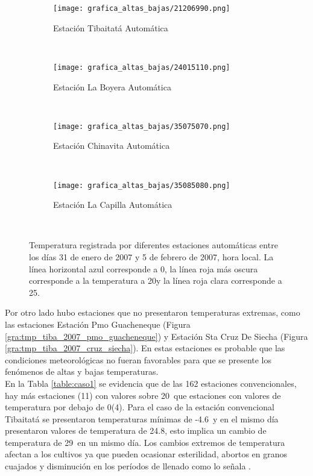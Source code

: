 \begin{figure}[H]\ContinuedFloat
\centering
\begin{subfigure}[normla]{0.4\textwidth}
\caption{Estación Tibaitatá Automática}
\texttt{[image: grafica\_altas\_bajas/21206990.png]}
\label{gra:tmp_tiba_2007_tibaitata}
\end{subfigure}
~
\begin{subfigure}[normla]{0.4\textwidth}
\caption{Estación La Boyera Automática}
\texttt{[image: grafica\_altas\_bajas/24015110.png]}
\label{gra:tmp_tiba_2007_la_boyera}
\end{subfigure}
~
\begin{subfigure}[normla]{0.4\textwidth}
\caption{Estación Chinavita Automática}
\texttt{[image: grafica\_altas\_bajas/35075070.png]}
\label{gra:tmp_tiba_2007_chinavita}
\end{subfigure}
~
\begin{subfigure}[normla]{0.4\textwidth}
\caption{Estación La Capilla Automática}
\texttt{[image: grafica\_altas\_bajas/35085080.png]}
\label{gra:tmp_tiba_2007_capilla}
\end{subfigure}
~
    
    
    \caption{Temperatura registrada por diferentes estaciones automáticas entre los días 31 de enero de 2007 y 5 de febrero de 2007, hora local. La línea horizontal azul corresponde a 0\celc, la línea roja más oscura corresponde a la temperatura a 20\celc y la línea roja clara corresponde a 25\celc.}
    \label{gra:tmp_tiba_2007}
\end{figure}



Por otro lado hubo estaciones que no presentaron temperaturas extremas, como las estaciones Estación Pmo Guacheneque (Figura \ref{gra:tmp_tiba_2007_pmo_guacheneque}) y Estación Sta Cruz De Siecha (Figura \ref{gra:tmp_tiba_2007_cruz_siecha}). En estas estaciones es probable que las condiciones meteorológicas no fueran favorables para que se presente los fenómenos de altas y bajas temperaturas.\\

En la Tabla \ref{table:caso1} se evidencia que de las 162 estaciones convencionales, hay más estaciones (11) con valores sobre 20\celc\ que estaciones con valores de temperatura por debajo de 0\celc (4). Para el caso de la estación convencional Tibaitatá se presentaron temperaturas mínimas de -4.6\celc\ y en el mismo día presentaron valores de temperatura de 24.8\celc, esto implica un cambio de temperatura de 29\celc\ en un mismo día. Los cambios extremos de temperatura afectan a los cultivos ya que pueden ocasionar esterilidad, abortos en granos cuajados y disminución en los períodos de llenado como lo señala \citet{Hatfield2015}.\\

